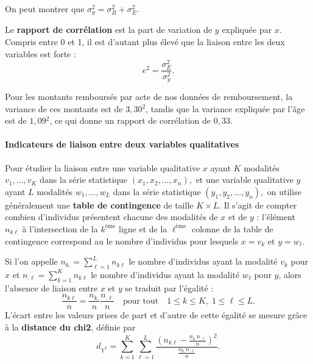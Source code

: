 On peut montrer que $\sigma_y^2 = \sigma_R^2 + \sigma_E^2.$

Le \textbf{rapport de corrélation} est la part de variation de $y$ expliquée
par $x$. Compris entre 0 et 1, il est d'autant plus élevé que la liaison entre
les deux variables est forte :
\[
e^2  = \frac{\sigma_E^2}{\sigma_y^2}.
\]
\begin{exemple}
	Pour les montants remboursés par acte de nos données de remboursement, la
	variance de ces montants est de $3,30$\texteuro$^2$, tandis que la variance
	expliquée par l'âge est de $1,09$\texteuro$^2$, ce qui donne un rapport de
	corrélation de $0,33.$ 
\end{exemple}

\paragraph{Indicateurs de liaison entre deux variables qualitatives}
Pour étudier la liaison entre une variable qualitative $x$ ayant $K$ modalités $v_1,\dots,v_K$ dans la série statistique $(x_1, x_2, \dots, x_n),$ et une
variable qualitative $y$ ayant $L$ modalités $w_1,\dots,w_L$ dans la série statistique
$(y_1, y_2, \dots, y_n),$ on utilise généralement une \textbf{table de
	contingence} de taille $K \times L.$ Il s'agit de compter combien d'individus présentent chacune des modalités de $x$ et de $y$ : l'élément $n_{k\ell}$ à l'intersection de la $k^{\text{ème}}$ ligne et de la $\ell^{\text{ème}}$ colonne de la table de contingence correspond au le nombre d'individus pour lesquels $x = v_k$ et $y = w_\ell$.

Si l'on appelle $n_{k\boldsymbol{.}} = \sum_{\ell=1}^L n_{k\ell}$ le nombre d'individus ayant la modalité
$v_k$ pour $x$ et $n_{\boldsymbol{.}\ell} = \sum_{k=1}^K n_{k\ell}$ le nombre d'individus ayant la modalité $w_\ell$ pour $y$,
alors l'absence de liaison entre $x$ et $y$ se traduit par l'égalité :
\[
\frac{n_{k\ell}}{n} = \frac{n_{k\boldsymbol{.}}}{n}
\frac{n_{\boldsymbol{.}\ell}}{n} \quad \text{pour tout} \quad
1 \leq k \leq K,\; 1 \leq \ell \leq L.
\]
L'écart entre les valeurs prises de part et d'autre de cette égalité se mesure
grâce à la \textbf{distance du chi2}, définie par 
\[
d_{\chi^2} = \sum_{k=1}^K \sum_{\ell=1}^L  \dfrac{\left( n_{k\ell} - 
	\frac{n_{k\boldsymbol{.}}n_{\boldsymbol{.}\ell}}{n} \right)^2}{\frac{n_{k\boldsymbol{.}}n_{\boldsymbol{.}\ell}}{n}}.
\]

